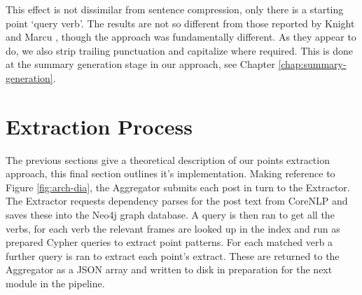     This effect is not dissimilar from sentence compression, only there is a starting point `query verb'. The results are not so different from those reported by Knight and Marcu \cite{knight2000statistics}, though the approach was fundamentally different. As they appear to do, we also strip trailing punctuation and capitalize where required. This is done at the summary generation stage in our approach, see Chapter \ref{chap:summary-generation}.

  \section{Extraction Process}
    The previous sections give a theoretical description of our points extraction approach, this final section outlines it's implementation. Making reference to Figure \ref{fig:arch-dia}, the Aggregator submits each post in turn to the Extractor. The Extractor requests dependency parses for the post text from CoreNLP and saves these into the Neo4j graph database. A query is then ran to get all the verbs, for each verb the relevant frames are looked up in the index and run as prepared Cypher queries to extract point patterns. For each matched verb a further query is ran to extract each point's extract. These are returned to the Aggregator as a JSON array and written to disk in preparation for the next module in the pipeline.
